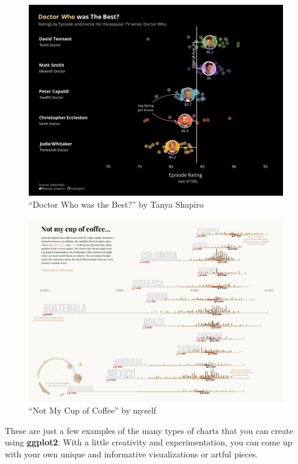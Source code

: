 \documentclass[
]{krantz}
\begin{document}
\begin{figure}
\centering
\includegraphics{./img/showcase/doctor-who-tanya-shapiro.png}
\caption{\label{fig:02imgVizDoctorWho}``Doctor Who was the Best?'' by Tanya Shapiro}
\end{figure}

\begin{figure}
\centering
\includegraphics{./img/showcase/coffee-ratings-cedric-scherer.png}
\caption{\label{fig:02imgVizCoffeeRatings}``Not My Cup of Coffee'' by myself}
\end{figure}

These are just a few examples of the many types of charts that you can create using \textbf{ggplot2}. With a little creativity and experimentation, you can come up with your own unique and informative visualizations or artful pieces.
\end{document}
